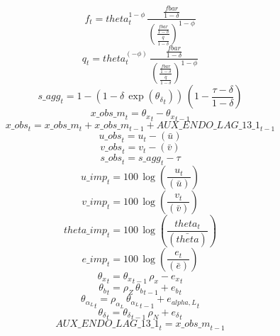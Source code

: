 \begin{dmath}
{{f}}_{t}={{theta}}_{t}^{1-{\phi}}\, \frac{\frac{{fbar}}{1-{{\delta}}}}{\left(\frac{\frac{{fbar}}{1-{{\delta}}}}{\frac{{{\overline{q}}}}{1-{{\delta}}}}\right)^{1-{\phi}}}
\end{dmath}
\begin{dmath}
{{q}}_{t}={{theta}}_{t}^{\left(-{\phi}\right)}\, \frac{\frac{{fbar}}{1-{{\delta}}}}{\left(\frac{\frac{{fbar}}{1-{{\delta}}}}{\frac{{{\overline{q}}}}{1-{{\delta}}}}\right)^{1-{\phi}}}
\end{dmath}
\begin{dmath}
{s\_agg}_{t}=1-\left(1-{{\delta}}\, \exp\left({{\theta_{\delta}}}_{t}\right)\right)\, \left(1-\frac{{{\tau}}-{{\delta}}}{1-{{\delta}}}\right)
\end{dmath}
\begin{dmath}
{x\_obs\_m}_{t}={{\theta_x}}_{t}-{{\theta_x}}_{t-1}
\end{dmath}
\begin{dmath}
{x\_obs}_{t}={x\_obs\_m}_{t}+{x\_obs\_m}_{t-1}+{AUX\_ENDO\_LAG\_13\_1}_{t-1}
\end{dmath}
\begin{dmath}
{u\_obs}_{t}={{u}}_{t}-(\bar{{u}})
\end{dmath}
\begin{dmath}
{v\_obs}_{t}={{v}}_{t}-(\bar{{v}})
\end{dmath}
\begin{dmath}
{s\_obs}_{t}={s\_agg}_{t}-{{\tau}}
\end{dmath}
\begin{dmath}
{u\_imp}_{t}=100\, \log\left(\frac{{{u}}_{t}}{(\bar{{u}})}\right)
\end{dmath}
\begin{dmath}
{v\_imp}_{t}=100\, \log\left(\frac{{{v}}_{t}}{(\bar{{v}})}\right)
\end{dmath}
\begin{dmath}
{theta\_imp}_{t}=100\, \log\left(\frac{{{theta}}_{t}}{(\bar{{theta}})}\right)
\end{dmath}
\begin{dmath}
{e\_imp}_{t}=100\, \log\left(\frac{{{e}}_{t}}{(\bar{{e}})}\right)
\end{dmath}
\begin{dmath}
{{\theta_x}}_{t}={{\theta_x}}_{t-1}\, {{\rho_x}}-{{e_x}}_{t}
\end{dmath}
\begin{dmath}
{{\theta_b}}_{t}={{\rho_Z}}\, {{\theta_b}}_{t-1}+{{e_{b}}}_{t}
\end{dmath}
\begin{dmath}
{{\theta_{\alpha_L}}}_{t}={{\rho_{\alpha_L}}}\, {{\theta_{\alpha_L}}}_{t-1}+{{e_{alpha,L}}}_{t}
\end{dmath}
\begin{dmath}
{{\theta_{\delta}}}_{t}={{\theta_{\delta}}}_{t-1}\, {{\rho_N}}+{{e_{\delta}}}_{t}
\end{dmath}
\begin{dmath}
{AUX\_ENDO\_LAG\_13\_1}_{t}={x\_obs\_m}_{t-1}
\end{dmath}
